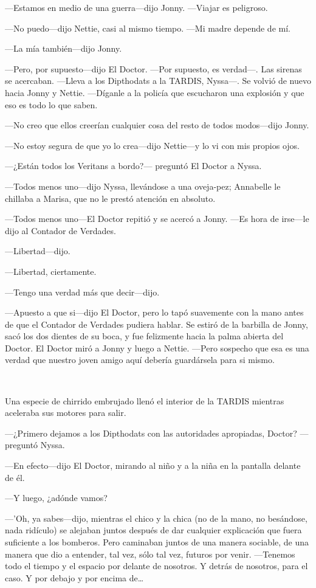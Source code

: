 ---Estamos en medio de una guerra---dijo Jonny. ---Viajar es peligroso.

---No puedo---dijo Nettie, casi al mismo tiempo. ---Mi madre depende de
mí.

---La mía también---dijo Jonny.

---Pero, por supuesto---dijo El Doctor. ---Por supuesto, es verdad---.
Las sirenas se acercaban. ---Lleva a los Dipthodats a la TARDIS,
Nyssa---. Se volvió de nuevo hacia Jonny y Nettie. ---Díganle a la
policía que escucharon una explosión y que eso es todo lo que saben.

---No creo que ellos creerían cualquier cosa del resto de todos
modos---dijo Jonny.

---No estoy segura de que yo lo crea---dijo Nettie---y lo vi con mis
propios ojos.

---¿Están todos los Veritans a bordo?--- preguntó El Doctor a Nyssa.

---Todos menos uno---dijo Nyssa, llevándose a una oveja-pez; Annabelle
le chillaba a Marisa, que no le prestó atención en absoluto.

---Todos menos uno---El Doctor repitió y se acercó a Jonny. ---Es hora
de irse---le dijo al Contador de Verdades.

---Libertad---dijo.

---Libertad, ciertamente.

---Tengo una verdad más que decir---dijo.

---Apuesto a que si---dijo El Doctor, pero lo tapó suavemente con la
mano antes de que el Contador de Verdades pudiera hablar. Se estiró de
la barbilla de Jonny, sacó los dos dientes de su boca, y fue felizmente
hacia la palma abierta del Doctor. El Doctor miró a Jonny y luego a
Nettie. ---Pero sospecho que esa es una verdad que nuestro joven amigo
aquí debería guardársela para si mismo.

~

Una especie de chirrido embrujado llenó el interior de la TARDIS
mientras aceleraba sus motores para salir.

---¿Primero dejamos a los Dipthodats con las autoridades apropiadas,
Doctor? ---preguntó Nyssa.

---En efecto---dijo El Doctor, mirando al niño y a la niña en la
pantalla delante de él.

---Y luego, ¿adónde vamos?

---'Oh, ya sabes---dijo, mientras el chico y la chica (no de la mano, no
besándose, nada ridículo) se alejaban juntos después de dar cualquier
explicación que fuera suficiente a los bomberos. Pero caminaban juntos
de una manera sociable, de una manera que dio a entender, tal vez, sólo
tal vez, futuros por venir. ---Tenemos todo el tiempo y el espacio por
delante de nosotros. Y detrás de nosotros, para el caso. Y por debajo y
por encima de\ldots{}

